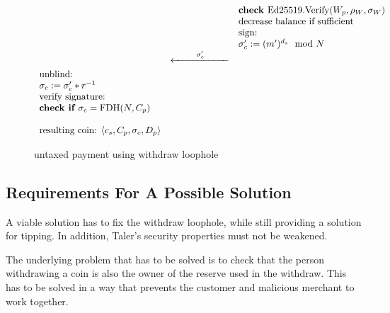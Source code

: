 \begin{figure}[h]
\begin{equation*}
\begin{array}{ l c l}
            \\ & & \textbf{check } \text{Ed25519.Verify}(W_p, \rho_W, \sigma_W)
            \\ & & \text{decrease balance if sufficient}
            \\ & & \text{sign:}
            \\ & & \sigma'_c := (m')^{d_s} \mod N
            \\ & \xleftarrow[\rule{2cm}{0pt}]{\sigma'_c}
            \\ \text{unblind:}
            \\ \sigma_c := \sigma'_c*r^{-1}
            \\ \text{verify signature:}
            \\ \textbf{check if } \sigma_c = \text{FDH}(N, C_p)
            \\
            \\ \text{resulting coin: } \langle c_s, C_p, \sigma_c, D_p \rangle
        \end{array}
    \end{equation*}
    \caption{untaxed payment using withdraw loophole}
    \label{fig:withdraw-loophole-exploit}
\end{figure}

\subsection{Requirements For A Possible Solution}
A viable solution has to fix the withdraw loophole, while still providing a solution for tipping. In addition, Taler's security properties must not be weakened.

The underlying problem that has to be solved is to check that the person withdrawing a coin is also the owner of the reserve used in the withdraw.
This has to be solved in a way that prevents the customer and malicious merchant to work together.



